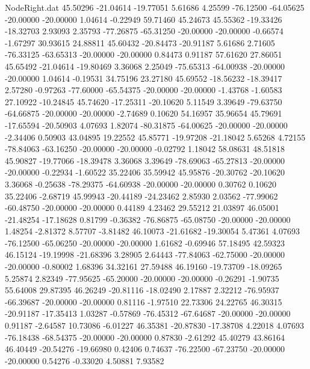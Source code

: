 \begin{filecontents}{NodeRight.dat}
  45.50296  -21.04614  -19.77051     5.61686    4.25599  -76.12500  -64.05625  -20.00000  -20.00000    1.04614   -0.22949   59.71460   45.24673
  45.55362  -19.33426  -18.32703     2.93093    2.35793  -77.26875  -65.31250  -20.00000  -20.00000   -0.66574   -1.67297   30.93615   24.88811
  45.60432  -20.84473  -20.91187     5.61686    2.71605  -76.33125  -63.65313  -20.00000  -20.00000    0.84473    0.91187   57.61620   27.86051
  45.65492  -21.04614  -19.80469     3.36068    2.25049  -75.65313  -64.00938  -20.00000  -20.00000    1.04614   -0.19531   34.75196   23.27180
  45.69552  -18.56232  -18.39417     2.57280   -0.97263  -77.60000  -65.54375  -20.00000  -20.00000   -1.43768   -1.60583   27.10922  -10.24845
  45.74620  -17.25311  -20.10620     5.11549    3.39649  -79.63750  -64.66875  -20.00000  -20.00000   -2.74689    0.10620   54.16957   35.96654
  45.79691  -17.65594  -20.50903     4.07693    1.82074  -80.31875  -64.00625  -20.00000  -20.00000   -2.34406    0.50903   43.04895   19.22552
  45.85771  -19.97208  -21.18042     5.65268    4.72155  -78.84063  -63.16250  -20.00000  -20.00000   -0.02792    1.18042   58.08631   48.51818
  45.90827  -19.77066  -18.39478     3.36068    3.39649  -78.69063  -65.27813  -20.00000  -20.00000   -0.22934   -1.60522   35.22406   35.59942
  45.95876  -20.30762  -20.10620     3.36068   -0.25638  -78.29375  -64.60938  -20.00000  -20.00000    0.30762    0.10620   35.22406   -2.68719
  45.99943  -20.44189  -24.23462     2.85930    2.03562  -77.99062  -60.48750  -20.00000  -20.00000    0.44189    4.23462   29.55212   21.03897
  46.05001  -21.48254  -17.18628     0.81799   -0.36382  -76.86875  -65.08750  -20.00000  -20.00000    1.48254   -2.81372    8.57707   -3.81482
  46.10073  -21.61682  -19.30054     5.47361    4.07693  -76.12500  -65.06250  -20.00000  -20.00000    1.61682   -0.69946   57.18495   42.59323
  46.15124  -19.19998  -21.68396     3.28905    2.64443  -77.84063  -62.75000  -20.00000  -20.00000   -0.80002    1.68396   34.32161   27.59488
  46.19160  -19.73709  -18.09265     5.25874    2.82349  -77.95625  -65.20000  -20.00000  -20.00000   -0.26291   -1.90735   55.64008   29.87395
  46.26249  -20.81116  -18.02490     2.17887    2.32212  -76.95937  -66.39687  -20.00000  -20.00000    0.81116   -1.97510   22.73306   24.22765
  46.30315  -20.91187  -17.35413     1.03287   -0.57869  -76.45312  -67.64687  -20.00000  -20.00000    0.91187   -2.64587   10.73086   -6.01227
  46.35381  -20.87830  -17.38708     4.22018    4.07693  -76.18438  -68.54375  -20.00000  -20.00000    0.87830   -2.61292   45.40279   43.86164
  46.40449  -20.54276  -19.66980     0.42406    0.74637  -76.22500  -67.23750  -20.00000  -20.00000    0.54276   -0.33020    4.50881    7.93582

\end{filecontents}
